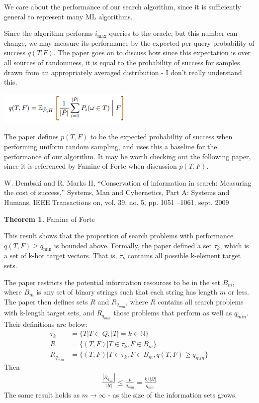 \documentclass{article}
\begin{document}
We care about the performance of our search algorithm, since it is sufficiently general to represent many ML algorithms. 

Since the algorithm performs $i_{\text{max}}$ queries to the oracle, but this number can change, we may measure its performance by the expected per-query probability of success $q(T|F)$. The paper goes on to discuss how since this expectation is over all sources of randomness, it is equal to the probability of success for samples drawn from an appropriately averaged distribution - I don't really understand this. 

\begin{center}
    \includegraphics{ExpectedSuccess.PNG}
\end{center}

The paper defines $p(T,F)$ to be the expected probability of success when performing uniform random sampling, and uses this a baseline for the performance of our algorithm. It may be worth checking out the following paper, since it is referenced by Famine of Forte when discussion $p(T,F)$. 


W. Dembski and R. Marks II, “Conservation of information in search:
Measuring the cost of success,” Systems, Man and Cybernetics, Part A:
Systems and Humans, IEEE Transactions on, vol. 39, no. 5, pp. 1051
–1061, sept. 2009

\newpage

\textbf{Theorem 1.} Famine of Forte

This result shows that the proportion of search problems with performance $q(T,F) \geq q_{\text{min}}$ is bounded above. Formally, the paper defined a set $\tau_k$, which is a set of k-hot target vectors. That is, $\tau_k$ contains all possible k-element target sets. 

The paper restricts the potential information resources to be in the set $B_m$, where $B_m$ is any set of binary strings such that each string has length $m$ or less. The paper then defines sets $R$ and $R_{q_{min}}$, where $R$ contains all search problems with k-length target sets, and $R_{q_{min}}$ those problems that perform as well as $q_{min}$. Their definitions are below: 
\begin{align*}
    \tau_k &= \{T | T \subset Q, |T| = k \in \mathds{N}\} \\ 
    R &= \{(T,F) | T \in \tau_k, F \in B_m\} \\
    R_{q_{min}} &= \{(T,F) | T \in \tau_k, F \in B_m, q(T,F) \geq q_{min}\}
\end{align*}
Then 
\begin{align*}
    \frac{|R_{q_{min}}|}{|R|} \leq \frac{p}{q_{min}} = \frac{k / |\Omega|}{q_{min}}
\end{align*}
The same result holds as $m \to \infty$ - as the size of the information sets grows.
\end{document}
